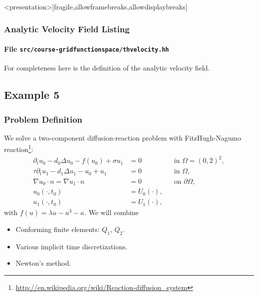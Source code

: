 \begin{frame}<presentation>[fragile,allowframebreaks,allowdisplaybreaks]
\frametitle<presentation>{Analytic Velocity Field Listing}
\framesubtitle<presentation>{File \texttt{src/course-gridfunctionspace/thvelocity.hh}}
For completeness here is the definition of the analytic velocity field.

\end{frame}

\subsection{Example 5}

\begin{frame}
\frametitle{Problem Definition}
We solve a two-component diffusion-reaction problem with FitzHugh-Nagumo 
reaction\footnote{\url{http://en.wikipedia.org/wiki/Reaction-diffusion_system}}:
\begin{subequations}
\begin{align*}
\partial_t u_0 - d_0 \Delta u_0 - f(u_0) + \sigma u_1 &= 0 &&\text{in $\Omega=(0,2)^2$},\\
\tau\partial_t u_1 - d_1 \Delta u_1 - u_0 + u_1 &= 0 &&\text{in $\Omega$},\\
\nabla u_0 \cdot n = \nabla u_1 \cdot n &= 0 &&\text{on $\partial\Omega$},\\
u_0(\cdot,t_0) &= U_0(\cdot), \\ 
u_1(\cdot,t_0) &= U_1(\cdot),
\end{align*}
\end{subequations}
with $f(u) = \lambda u - u^3 - \kappa$.
We will combine
\begin{itemize}
\item Conforming finite elements: $Q_1$, $Q_2$.
\item Various implicit time discretizations.
\item Newton's method.
\end{itemize}
\end{frame}

